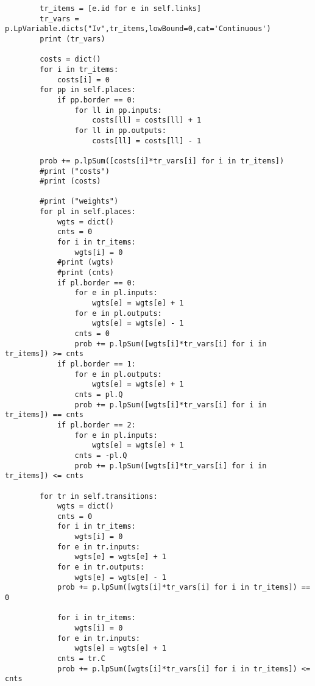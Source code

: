 \documentclass[12pt,a4paper]{book}
\begin{document}
\begin{verbatim}
        tr_items = [e.id for e in self.links]
        tr_vars = p.LpVariable.dicts("Iv",tr_items,lowBound=0,cat='Continuous')
        print (tr_vars)
        
        costs = dict()
        for i in tr_items:
            costs[i] = 0
        for pp in self.places:
            if pp.border == 0:
                for ll in pp.inputs:
                    costs[ll] = costs[ll] + 1
                for ll in pp.outputs:
                    costs[ll] = costs[ll] - 1

        prob += p.lpSum([costs[i]*tr_vars[i] for i in tr_items])
        #print ("costs")
        #print (costs)
        
        #print ("weights")
        for pl in self.places:
            wgts = dict()
            cnts = 0
            for i in tr_items:
                wgts[i] = 0
            #print (wgts)
            #print (cnts)
            if pl.border == 0:
                for e in pl.inputs:
                    wgts[e] = wgts[e] + 1
                for e in pl.outputs:
                    wgts[e] = wgts[e] - 1
                cnts = 0
                prob += p.lpSum([wgts[i]*tr_vars[i] for i in tr_items]) >= cnts
            if pl.border == 1:
                for e in pl.outputs:
                    wgts[e] = wgts[e] + 1
                cnts = pl.Q
                prob += p.lpSum([wgts[i]*tr_vars[i] for i in tr_items]) == cnts
            if pl.border == 2:
                for e in pl.inputs:
                    wgts[e] = wgts[e] + 1
                cnts = -pl.Q
                prob += p.lpSum([wgts[i]*tr_vars[i] for i in tr_items]) <= cnts

        for tr in self.transitions:
            wgts = dict()
            cnts = 0
            for i in tr_items:
                wgts[i] = 0
            for e in tr.inputs:
                wgts[e] = wgts[e] + 1
            for e in tr.outputs:
                wgts[e] = wgts[e] - 1
            prob += p.lpSum([wgts[i]*tr_vars[i] for i in tr_items]) == 0
            
            for i in tr_items:
                wgts[i] = 0
            for e in tr.inputs:
                wgts[e] = wgts[e] + 1
            cnts = tr.C
            prob += p.lpSum([wgts[i]*tr_vars[i] for i in tr_items]) <= cnts


\end{verbatim}
\end{document}
